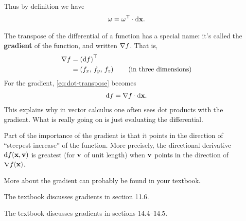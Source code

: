 \documentclass[12pt]{amsart}
\begin{document}
Thus by definition we have
\begin{equation}\label{eq:dot-transpose}
  \omega = {\omega}^\top \cdot {\ensuremath{\mathrm{d} \mathbf{x}}}.
\end{equation}

The transpose of the differential of a function has a special name: it's called the \textbf{gradient} of the function, and written $\nabla f$.
That is,
\begin{align*}
  \nabla f &= {({\mathrm{d} f})}^\top\\
  &= \left({f}_{x},\,{f}_{y},\,{f}_{z}\right) \qquad\text{(in three dimensions)}
\end{align*}
For the gradient, \cref{eq:dot-transpose} becomes
\[ {\mathrm{d} f} = \nabla f \cdot {\ensuremath{\mathrm{d} \mathbf{x}}}. \]
This explains why in vector calculus one often sees dot products with the gradient.
What is really going on is just evaluating the differential.

Part of the importance of the gradient is that it points in the direction of ``steepest increase'' of the function.
More precisely, the directional derivative ${\mathrm{d} f}(\mathbf{x},\mathbf{v})$ is greatest (for $\mathbf{v}$ of unit length) when $\mathbf{v}$ points in the direction of $\nabla f(\mathbf{x})$.
\begin{notextbook}More about the gradient can probably be found in your textbook.\end{notextbook}%
\begin{stewart}The textbook discusses gradients in section 11.6.\end{stewart}%
\begin{hugheshallett}The textbook discusses gradients in sections 14.4--14.5.\end{hugheshallett}
\end{document}
